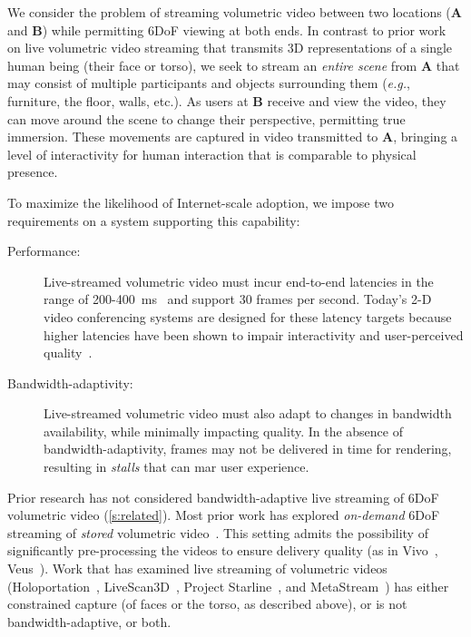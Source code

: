 We consider the problem of streaming volumetric video between two locations (\textbf{A} and \textbf{B}) while permitting 6DoF viewing at both ends.
%
In contrast to prior work~\cite{starline,farfetchfusion} on live volumetric video streaming that transmits 3D representations of a single human being (their face or torso), we seek to stream an \textit{entire scene} from \textbf{A} that may consist of multiple participants and objects surrounding them (\textit{e.g.}, furniture, the floor, walls, etc.).
%
As users at \textbf{B} receive and view the video, they can move around the scene to change their perspective, permitting true immersion.
%
%
These movements are captured in video transmitted to \textbf{A}, bringing a level of interactivity for human interaction that is comparable to physical presence.
%

To maximize the likelihood of Internet-scale adoption, we impose two requirements on a system supporting this capability:
\begin{description}
\item[Performance:] Live-streamed volumetric video must incur end-to-end latencies in the range of 200-400~ms~\cite{cite:acm-mm,salsify} and support 30 frames per second.
%
Today's 2-D video conferencing systems are designed for these latency targets because higher latencies have been shown to impair interactivity and user-perceived quality~\cite{xxx}.
\item[Bandwidth-adaptivity:] Live-streamed volumetric video must also adapt to changes in bandwidth availability, while minimally impacting quality.
%
In the absence of bandwidth-adaptivity, frames may not be delivered in time for rendering, resulting in \textit{stalls} that can mar user experience.
\end{description}

Prior research has not considered bandwidth-adaptive live streaming of 6DoF volumetric video (\cref{s:related}).
%
Most prior work has explored \emph{on-demand} 6DoF streaming of \emph{stored} volumetric video~\cite{xxx}.
%
This setting admits the possibility of significantly pre-processing the videos to ensure delivery quality (\eg as in Vivo~\cite{cite:vivo}, Veus~\cite{cite:veus}).
%
Work that has examined live streaming of volumetric videos (Holoportation~\cite{cite:holoportation}, LiveScan3D~\cite{cite:livescan3d}, Project Starline~\cite{cite:starline}, and MetaStream~\cite{cite:metastream}) has either constrained capture (\eg of faces or the torso, as described above), or is not bandwidth-adaptive, or both.
  

